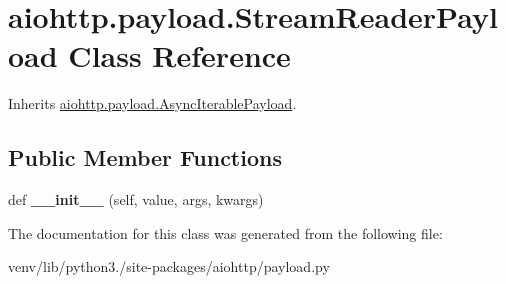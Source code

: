 \hypertarget{classaiohttp_1_1payload_1_1_stream_reader_payload}{}\section{aiohttp.\+payload.\+Stream\+Reader\+Payload Class Reference}
\label{classaiohttp_1_1payload_1_1_stream_reader_payload}


Inherits \hyperlink{classaiohttp_1_1payload_1_1_async_iterable_payload}{aiohttp.\+payload.\+Async\+Iterable\+Payload}.

\subsection*{Public Member Functions}
\begin{DoxyCompactItemize}
\item 
\mbox{\label{classaiohttp_1_1payload_1_1_stream_reader_payload_a8470fad161d8ce58115235ab3f011aad}} 
def {\bfseries \+\_\+\+\_\+init\+\_\+\+\_\+} (self, value, args, kwargs)
\end{DoxyCompactItemize}


The documentation for this class was generated from the following file\+:\begin{DoxyCompactItemize}
\item 
venv/lib/python3./site-\/packages/aiohttp/payload.\+py\end{DoxyCompactItemize}
